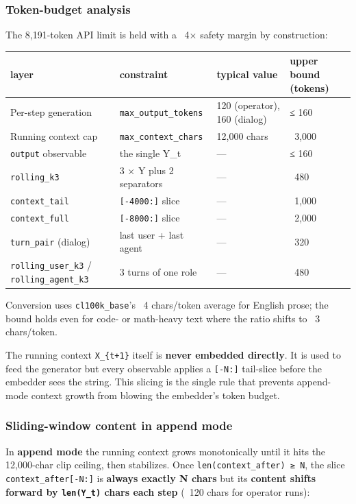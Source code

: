 \documentclass{article}
\theoremstyle{plain}
\theoremstyle{definition}
\begin{document}
\subsubsection{Token-budget analysis}

The 8,191-token API limit is held with a ~4× safety margin by
construction:

\begin{table}[h!]
\centering
\small
\begin{tabular}{llll}
\toprule
layer & constraint & typical value & upper bound (tokens) \\
\midrule
Per-step generation & \texttt{max\_output\_tokens} & 120 (operator), 160 (dialog) & ≤ 160 \\
Running context cap & \texttt{max\_context\_chars} & 12,000 chars & ~3,000 \\
\texttt{output} observable & the single Y\_t & — & ≤ 160 \\
\texttt{rolling\_k3} & 3 × Y plus 2 separators & — & ~480 \\
\texttt{context\_tail} & \texttt{[-4000:]} slice & — & ~1,000 \\
\texttt{context\_full} & \texttt{[-8000:]} slice & — & ~2,000 \\
\texttt{turn\_pair} (dialog) & last user + last agent & — & ~320 \\
\texttt{rolling\_user\_k3} / \texttt{rolling\_agent\_k3} & 3 turns of one role & — & ~480 \\
\bottomrule
\end{tabular}
\end{table}

Conversion uses \texttt{cl100k\_base}'s ~4 chars/token average for English
prose; the bound holds even for code- or math-heavy text where the
ratio shifts to ~3 chars/token.

The running context \texttt{X\_\{t+1\}} itself is \textbf{never embedded directly}.
It is used to feed the generator but every observable applies a \texttt{[-N:]}
tail-slice before the embedder sees the string. This slicing is the
single rule that prevents append-mode context growth from blowing the
embedder's token budget.

\subsubsection{Sliding-window content in append mode}

In \textbf{append mode} the running context grows monotonically until it
hits the 12,000-char clip ceiling, then stabilizes. Once
\texttt{len(context\_after) ≥ N}, the slice \texttt{context\_after[-N:]} is \textbf{always
exactly N chars} but its \textbf{content shifts forward by \texttt{len(Y\_t)} chars
each step} (~120 chars for operator runs):
\end{document}
